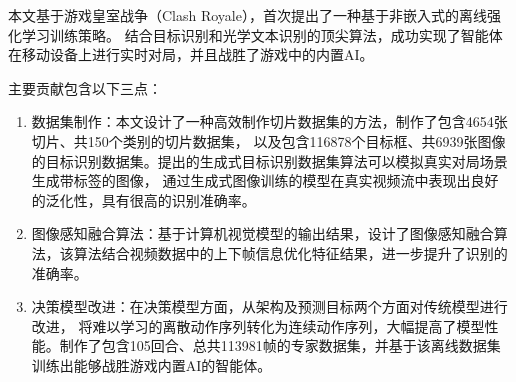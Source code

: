 

% 
% 
% 
% 
本文基于游戏皇室战争（Clash Royale），首次提出了一种基于非嵌入式的离线强化学习训练策略。
结合目标识别和光学文本识别的顶尖算法，成功实现了智能体在移动设备上进行实时对局，并且战胜了游戏中的内置AI。

主要贡献包含以下三点：
\begin{enumerate}
  \item 数据集制作：本文设计了一种高效制作切片数据集的方法，制作了包含4654张切片、共150个类别的切片数据集，
  以及包含116878个目标框、共6939张图像的目标识别数据集。提出的生成式目标识别数据集算法可以模拟真实对局场景生成带标签的图像，
  通过生成式图像训练的模型在真实视频流中表现出良好的泛化性，具有很高的识别准确率。
  \item 图像感知融合算法：基于计算机视觉模型的输出结果，设计了图像感知融合算法，该算法结合视频数据中的上下帧信息优化特征结果，进一步提升了识别的准确率。
  \item 决策模型改进：在决策模型方面，从架构及预测目标两个方面对传统模型进行改进，
  将难以学习的离散动作序列转化为连续动作序列，大幅提高了模型性能。制作了包含105回合、总共113981帧的专家数据集，并基于该离线数据集训练出能够战胜游戏内置AI的智能体。
\end{enumerate}

